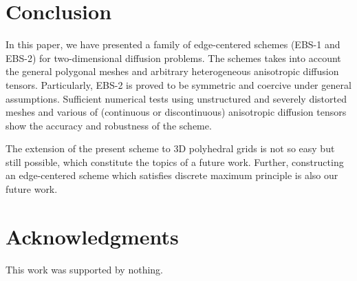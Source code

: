 \documentclass[times,review,preprint,authoryear]{elsarticle}
\begin{document}
\section{Conclusion}\label{sec6}

In this paper, we have presented a family of edge-centered schemes (EBS-1 and EBS-2) for two-dimensional diffusion problems.
The schemes takes into account the general polygonal meshes and arbitrary heterogeneous anisotropic diffusion tensors.
Particularly, EBS-2 is proved to be symmetric and coercive under general assumptions.
Sufficient numerical tests using unstructured and severely distorted meshes and various of (continuous or discontinuous) anisotropic diffusion tensors show the accuracy and robustness of the scheme.

The extension of the present scheme to 3D polyhedral grids is not so easy but still possible, which constitute the topics of a future work.
Further, constructing an edge-centered scheme which satisfies discrete maximum principle is also our future work.

\section*{Acknowledgments}

This work was supported by nothing.
\end{document}
